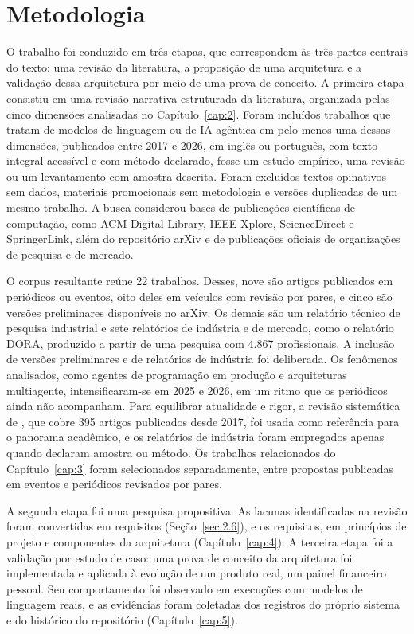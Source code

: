 \section{Metodologia}\label{sec:1.3}

O trabalho foi conduzido em três etapas, que correspondem às três partes centrais do texto: uma revisão da literatura, a proposição de uma arquitetura e a validação dessa arquitetura por meio de uma prova de conceito. A primeira etapa consistiu em uma revisão narrativa estruturada da literatura, organizada pelas cinco dimensões analisadas no Capítulo~\ref{cap:2}. Foram incluídos trabalhos que tratam de modelos de linguagem ou de IA agêntica em pelo menos uma dessas dimensões, publicados entre 2017 e 2026, em inglês ou português, com texto integral acessível e com método declarado, fosse um estudo empírico, uma revisão ou um levantamento com amostra descrita. Foram excluídos textos opinativos sem dados, materiais promocionais sem metodologia e versões duplicadas de um mesmo trabalho. A busca considerou bases de publicações científicas de computação, como ACM Digital Library, IEEE Xplore, ScienceDirect e SpringerLink, além do repositório arXiv e de publicações oficiais de organizações de pesquisa e de mercado.

O corpus resultante reúne 22 trabalhos. Desses, nove são artigos publicados em periódicos ou eventos, oito deles em veículos com revisão por pares, e cinco são versões preliminares disponíveis no arXiv. Os demais são um relatório técnico de pesquisa industrial e sete relatórios de indústria e de mercado, como o relatório DORA, produzido a partir de uma pesquisa com 4.867 profissionais. A inclusão de versões preliminares e de relatórios de indústria foi deliberada. Os fenômenos analisados, como agentes de programação em produção e arquiteturas multiagente, intensificaram-se em 2025 e 2026, em um ritmo que os periódicos ainda não acompanham. Para equilibrar atualidade e rigor, a revisão sistemática de , que cobre 395 artigos publicados desde 2017, foi usada como referência para o panorama acadêmico, e os relatórios de indústria foram empregados apenas quando declaram amostra ou método. Os trabalhos relacionados do Capítulo~\ref{cap:3} foram selecionados separadamente, entre propostas publicadas em eventos e periódicos revisados por pares.

A segunda etapa foi uma pesquisa propositiva. As lacunas identificadas na revisão foram convertidas em requisitos (Seção~\ref{sec:2.6}), e os requisitos, em princípios de projeto e componentes da arquitetura (Capítulo~\ref{cap:4}). A terceira etapa foi a validação por estudo de caso: uma prova de conceito da arquitetura foi implementada e aplicada à evolução de um produto real, um painel financeiro pessoal. Seu comportamento foi observado em execuções com modelos de linguagem reais, e as evidências foram coletadas dos registros do próprio sistema e do histórico do repositório (Capítulo~\ref{cap:5}).


